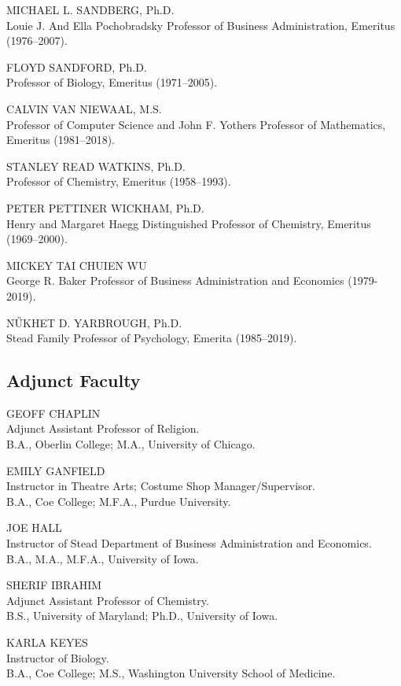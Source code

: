 \documentclass[
  letterpaper,
]{scrbook}
\begin{document}
MICHAEL L. SANDBERG, Ph.D.\\
Louie J. And Ella Pochobradsky Professor of Business Administration,
Emeritus (1976--2007).

FLOYD SANDFORD, Ph.D.\\
Professor of Biology, Emeritus (1971--2005).

CALVIN VAN NIEWAAL, M.S.\\
Professor of Computer Science and John F. Yothers Professor of
Mathematics, Emeritus (1981--2018).

STANLEY READ WATKINS, Ph.D.\\
Professor of Chemistry, Emeritus (1958--1993).

PETER PETTINER WICKHAM, Ph.D.\\
Henry and Margaret Haegg Distinguished Professor of Chemistry, Emeritus
(1969--2000).

MICKEY TAI CHUIEN WU\\
George R. Baker Professor of Business Administration and Economics
(1979-2019).

NŰKHET D. YARBROUGH, Ph.D.\\
Stead Family Professor of Psychology, Emerita (1985--2019).

\subsection{Adjunct Faculty}\label{adjunct-faculty}

GEOFF CHAPLIN\\
Adjunct Assistant Professor of Religion.\\
B.A., Oberlin College; M.A., University of Chicago.

EMILY GANFIELD\\
Instructor in Theatre Arts; Costume Shop Manager/Supervisor.\\
B.A., Coe College; M.F.A., Purdue University.

JOE HALL\\
Instructor of Stead Department of Business Administration and
Economics.\\
B.A., M.A., M.F.A., University of Iowa.

SHERIF IBRAHIM\\
Adjunct Assistant Professor of Chemistry.\\
B.S., University of Maryland; Ph.D., University of Iowa.

KARLA KEYES\\
Instructor of Biology.\\
B.A., Coe College; M.S., Washington University School of Medicine.
\end{document}
